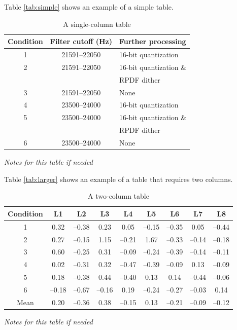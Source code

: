 \documentclass[paper=a4,fontsize=11pt,twocolumn]{article}
\begin{document}
Table \ref{tab:simple} shows an example of a simple table.

\begin{table}
\begin{centering}
\caption{A single-column table}\label{tab:one-column}
	\begin{tabular}[\columnwidth]{ccl}\toprule
		Condition &  Filter cutoff (Hz) &  Further processing \\
		\midrule
		1  & 21591--22050 & 16-bit quantization \\
		2  & 21591--22050 & 16-bit quantization \& \\
		 & & \hspace{8.1pt}RPDF dither \\
		3  & 21591--22050 & None \\
		4  & 23500--24000 & 16-bit quantization \\
		5  & 23500--24000 & 16-bit quantization \& \\
		 & & \hspace{8.1pt}RPDF dither \\
		6  & 23500--24000 & None \\
		\bottomrule
	\end{tabular}\par
	\medskip
\textit{Notes for this table if needed}
\end{centering}
\end{table}

Table \ref{tab:larger} shows an example of a table that requires two columns.

\begin{table}
\begin{centering}
\caption{A two-column table}\label{tab:two-column}%
	\begin{tabular}[\columnwidth]{ccccccccc}\toprule
	Condition & L1 & L2 & L3 & L4 & L5 & L6 & L7 & L8 \\
	\midrule
	1 & 0.32 & --0.38 & 0.23 & 0.05 & --0.15 & --0.35 & 0.05 & --0.44 \\
	2 & 0.27 & --0.15 & 1.15 & --0.21 & 1.67 & --0.33 & --0.14 & --0.18 \\
	3 & 0.60 & --0.25 & 0.31 & --0.09 & --0.24 & --0.39 & --0.14 & --0.11 \\
	4 & 0.02 & --0.31 & 0.32 & --0.47 & --0.39 & --0.09 & 0.13 & --0.09 \\
	5 & 0.18 & --0.38 & 0.44 & --0.40 & 0.13 & 0.14 & --0.44 & --0.06 \\
	6 & --0.18 & --0.67 & --0.16 & 0.19 & --0.24 & --0.27 & --0.03 & 0.14 \\
	\cmidrule{2-9}
	Mean & 0.20 & --0.36 & 0.38 & --0.15 & 0.13 & --0.21 & --0.09 & --0.12 \\
	\bottomrule
	\end{tabular}\par
	\medskip
\textit{Notes for this table if needed}
\end{centering}
\end{table}
\end{document}
